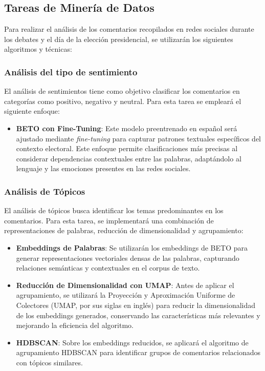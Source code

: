 \documentclass[10pt, a4paper]{article}
\begin{document}
	
	
	\subsection{Tareas de Minería de Datos}
	
	Para realizar el análisis de los comentarios recopilados en redes sociales durante los debates y el día de la elección presidencial, se utilizarán los siguientes algoritmos y técnicas:
	
	\subsubsection{Análisis del tipo de sentimiento}
	
	El análisis de sentimientos tiene como objetivo clasificar los comentarios en categorías como positivo, negativo y neutral. Para esta tarea se empleará el siguiente enfoque:
	
	\begin{itemize}
		\item \textbf{BETO con Fine-Tuning}: Este modelo preentrenado en español será ajustado mediante \textit{fine-tuning} para capturar patrones textuales específicos del contexto electoral. Este enfoque permite clasificaciones más precisas al considerar dependencias contextuales entre las palabras, adaptándolo al lenguaje y las emociones presentes en las redes sociales.
	\end{itemize}
	
	
	
	\subsubsection{Análisis de Tópicos}
	
	El análisis de tópicos busca identificar los temas predominantes en los comentarios. Para esta tarea, se implementará una combinación de representaciones de palabras, reducción de dimensionalidad y agrupamiento:
	
	\begin{itemize}
		\item \textbf{Embeddings de Palabras}: Se utilizarán los embeddings de BETO para generar representaciones vectoriales densas de las palabras, capturando relaciones semánticas y contextuales en el corpus de texto.
		\item \textbf{Reducción de Dimensionalidad con UMAP}: Antes de aplicar el agrupamiento, se utilizará la Proyección y Aproximación Uniforme de Colectores (UMAP, por sus siglas en inglés) para reducir la dimensionalidad de los embeddings generados, conservando las características más relevantes y mejorando la eficiencia del algoritmo.
		\item \textbf{HDBSCAN}: Sobre los embeddings reducidos, se aplicará el algoritmo de agrupamiento HDBSCAN para identificar grupos de comentarios relacionados con tópicos similares.
	\end{itemize}
	
\end{document}
